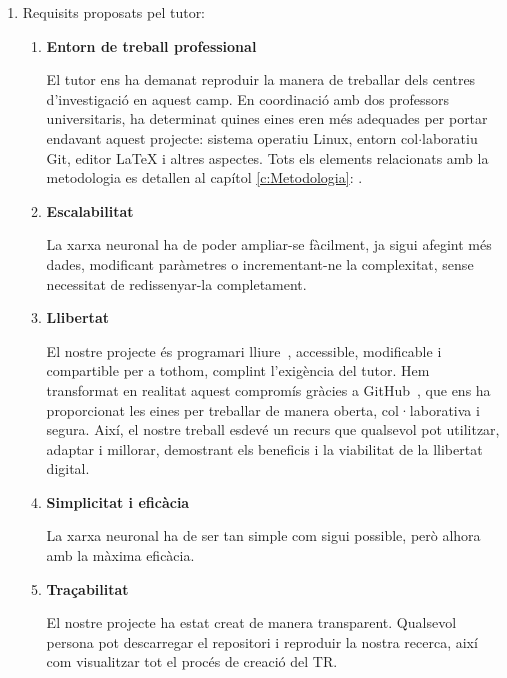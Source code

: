 \begin{enumerate}

    \item Requisits proposats pel tutor:

    \begin{enumerate}

        \item \textbf{Entorn de treball professional}

        El tutor ens ha demanat reproduir la manera de treballar dels centres d'investigació en aquest camp. En coordinació amb dos professors universitaris, ha determinat quines eines eren més adequades per portar endavant aquest projecte: sistema operatiu Linux, entorn col$\cdot$laboratiu Git, editor LaTeX i altres aspectes. Tots els elements relacionats amb la metodologia es detallen al capítol \ref{c:Metodologia}: .

        \item \textbf{Escalabilitat}

        La xarxa neuronal ha de poder ampliar-se fàcilment, ja sigui afegint més dades, modificant paràmetres o incrementant-ne la complexitat, sense necessitat de redissenyar-la completament.

        \item \textbf{Llibertat}

        El nostre projecte és programari lliure~\cite{ProgramariLliure}, accessible, modificable i compartible per a tothom, complint l’exigència del tutor. Hem transformat en realitat aquest compromís gràcies a GitHub~\cite{GitHub}, que ens ha proporcionat les eines per treballar de manera oberta, col·laborativa i segura. Així, el nostre treball esdevé un recurs que qualsevol pot utilitzar, adaptar i millorar, demostrant els beneficis i la viabilitat de la llibertat digital.

        \item \textbf{Simplicitat i eficàcia}

        La xarxa neuronal ha de ser tan simple com sigui possible, però alhora amb la màxima eficàcia.

        \item \textbf{Traçabilitat}

        El nostre projecte ha estat creat de manera transparent. Qualsevol persona pot descarregar el repositori i reproduir la nostra recerca, així com visualitzar tot el procés de creació del TR.

    \end{enumerate}


\end{enumerate}

